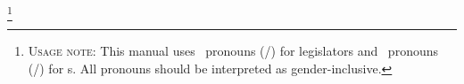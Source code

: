 \footnote{\textsc{Usage note:} 
This manual uses \lgender\ pronouns (\lnom/\lobj) for legislators 
and \pgender\ pronouns (\pnom/\pobj) for {\po}s. All pronouns should be interpreted as 
gender-inclusive.}